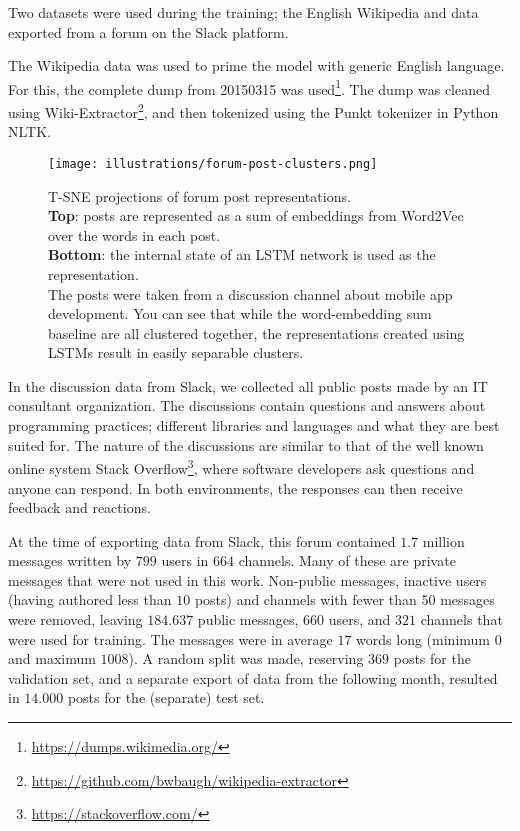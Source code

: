 \documentclass[11pt]{article}
\begin{document}
Two datasets were used during the training; the English Wikipedia and data exported from a forum on the Slack platform.

The Wikipedia data was used to prime the model with generic English language. For this, the complete dump from 20150315 was used\footnote{\url{https://dumps.wikimedia.org/}}. The dump was cleaned using Wiki-Extractor\footnote{\url{https://github.com/bwbaugh/wikipedia-extractor}}, and then tokenized using the Punkt tokenizer in Python NLTK.

\begin{figure}[h!]
  \texttt{[image: illustrations/forum-post-clusters.png]}
  \caption{T-SNE projections of forum post representations. \\
\textbf{Top}: posts are represented as a sum of embeddings from Word2Vec over the words in each post. \\
\textbf{Bottom}: the internal state of an LSTM network is used as the representation. \\
The posts were taken from a discussion channel about mobile app development. You can see that while the word-embedding sum baseline are all clustered together, the representations created using LSTMs result in easily separable clusters.
}
  \label{fig:post-clusters}
\end{figure}


In the discussion data from Slack, we collected all public posts made by an IT consultant organization. The discussions contain questions and answers about programming practices; different libraries and languages and what they are best suited for. The nature of the discussions are similar to that of the well known online system Stack Overflow\footnote{\url{https://stackoverflow.com/}}, where software developers ask questions and anyone can respond. In both environments, the responses can then receive feedback and reactions.

At the time of exporting data from Slack, this forum contained $1.7$ million messages written by $799$ users in $664$ channels. 
Many of these are private messages that were not used in this work.
Non-public messages, inactive users (having authored less than $10$ posts) and channels with fewer than $50$ messages were removed, leaving $184.637$ public messages, $660$ users, and $321$ channels that were used for training.
The messages were in average $17$ words long (minimum $0$ and maximum $1008$). A random split was made, reserving $369$ posts for the validation set, and a separate export of data from the following month, resulted in $14.000$ posts for the (separate) test set.
\end{document}

